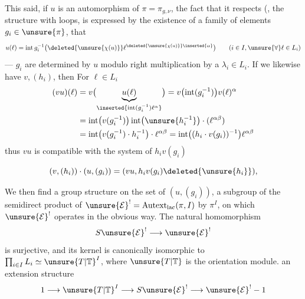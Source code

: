 This said, if $u$ is an automorphism of $\pi=\pi_{g,\nu}$, the fact that it respects (,  the structure with loops, is expressed by the existence of a family of elements $g_i\in\unsure{\pi}$,  that
\[
u(\ell)=\operatorname{int}g_i^{-1}\bigl(\deleted{\unsure{\chi(u)}}\ell^{\deleted{\unsure{\chi(u)}}\inserted{\alpha}}\bigr)
\qquad(i\in I,\unsure{\forall}\ell\in L_i)
\]
---  $g_i$ are determined by $u$  modulo right multiplication by a $\lambda_i\in L_i$. If we likewise have $v,(h_i)$, then  For $\ell\in L_i$ 
\[
\begin{aligned}
(vu)(\ell)
&=v\bigl(\underbrace{u(\ell)}_{\inserted{\operatorname{int}(g_i^{-1})\ell^{\alpha}}}\bigr)
=v\bigl(\operatorname{int}(g_i^{-1})\bigr)v(\ell)^{\alpha}\\
&=\operatorname{int}\bigl(v(g_i^{-1})\bigr)\operatorname{int}\bigl(\unsure{h_i^{-1}}\bigr)\cdot(\ell^{\alpha\beta})\\
&=\operatorname{int}\bigl(v(g_i^{-1})\cdot h_i^{-1}\bigr)\cdot\ell^{\alpha\beta}
=\operatorname{int}\bigl((h_i\cdot v(g_i))^{-1}\bigr)\ell^{\alpha\beta}
\end{aligned}
\]
thus $vu$ is compatible with the system of  $h_i v(g_i)$ 


\[
(v,(h_i))\cdot(u,(g_i))=(vu,h_i v(g_i)\deleted{\unsure{h_i}}),
\]

We then find a group structure on the set  of $(u,(g_i))$, a subgroup of the semidirect product of $\unsure{\mathcal E}^{!}=\mathrm{Autext}_{\mathrm{lac}}(\pi,I)$  by $\pi^I$, on which $\unsure{\mathcal E}^{!}$ operates in the obvious way. The natural homomorphism
\[
S\unsure{\mathcal E}^{!}\longrightarrow\unsure{\mathcal E}^{!}
\]
is surjective, and its kernel is canonically isomorphic to $\prod_{i\in I} L_i\simeq \unsure{T|\mathbb T}^I$, where $\unsure{T|\mathbb T}$ is the orientation module.
 an extension structure 
\[
1\longrightarrow \unsure{T|\mathbb T}^I\longrightarrow S\unsure{\mathcal E}^{!}\longrightarrow\unsure{\mathcal E}^{!}-1
\]

